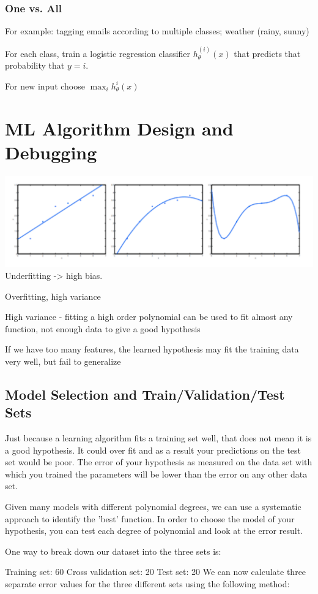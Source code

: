 \subsubsection{One vs. All}

For example: tagging emails according to multiple classes; weather (rainy, sunny)

For each class, train a logistic regression classifier $h_{\theta}^{(i)}(x)$ that predicts that probability that $y=i$.

For new input choose $\max_ih_\theta^i(x)$

\section{ML Algorithm Design and Debugging}

\includegraphics[width=0.5\columnwidth]{ml_figures/overfitting.png}
Underfitting -> high bias.

Overfitting, high variance

High variance - fitting a high order polynomial can be used to fit almost any function, not enough data to give a good hypothesis

If we have too many features, the learned hypothesis may fit the training data very well, but fail to generalize

\subsection{Model Selection and Train/Validation/Test Sets}
Just because a learning algorithm fits a training set well, that does not mean it is a good hypothesis. It could over fit and as a result your predictions on the test set would be poor. The error of your hypothesis as measured on the data set with which you trained the parameters will be lower than the error on any other data set.

Given many models with different polynomial degrees, we can use a systematic approach to identify the 'best' function. In order to choose the model of your hypothesis, you can test each degree of polynomial and look at the error result.

One way to break down our dataset into the three sets is:

Training set: 60%
Cross validation set: 20%
Test set: 20%
We can now calculate three separate error values for the three different sets using the following method:

